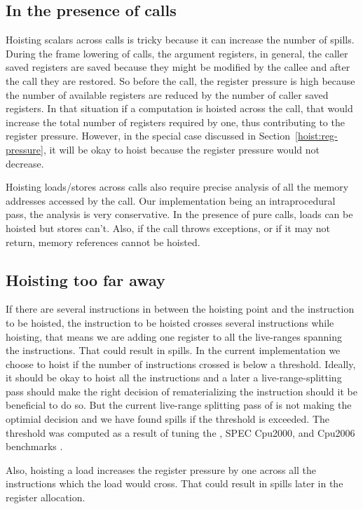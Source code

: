 \documentclass{sig-alternate}
\begin{document}
\subsection{In the presence of calls}
\label{cost:across-calls}
Hoisting scalars across calls is tricky because it can increase the number of
spills. During the frame lowering of calls, the argument registers, in general,
the caller saved registers are saved because they might be modified by the
callee and after the call they are restored. So before the
call, the register pressure is high because the number of available registers
are reduced by the number of caller saved registers. In that situation if a
computation is hoisted across the call, that would increase the total number of
registers required by one, thus contributing to the register pressure. However,
in the special case discussed in Section~\ref{hoist:reg-pressure}, it will be
okay to hoist because the register pressure would not decrease.

Hoisting loads/stores across calls also require precise analysis of all the
memory addresses accessed by the call. Our implementation being an
intraprocedural pass, the analysis is very conservative. In the presence of pure
calls, loads can be hoisted but stores can't. Also, if the call throws
exceptions, or if it may not return, memory references cannot be hoisted.

\subsection{Hoisting too far away}
If there are several instructions in between the hoisting point and the
instruction to be hoisted, the instruction to be hoisted crosses several
instructions while hoisting, that means we are adding one register to all the
live-ranges spanning the instructions. That could result in spills. In the
current implementation we choose to hoist if the number of instructions crossed
is below a threshold. Ideally, it should be okay to hoist all the instructions
and a later a live-range-splitting \cite{cooper1998live} pass should make the
right decision of rematerializing the instruction should it be beneficial to do
so. But the current live-range splitting pass of \LLVM{} is not making the
optimial decision and we have found spills if the threshold is exceeded. The
threshold was computed as a result of tuning the \LLVMTestSuite{}, SPEC Cpu2000,
and Cpu2006 benchmarks \cite{Henning2000}.

Also, hoisting a load increases the register pressure by one across all the
instructions which the load would cross. That could result in spills later in
the register allocation.
\end{document}
